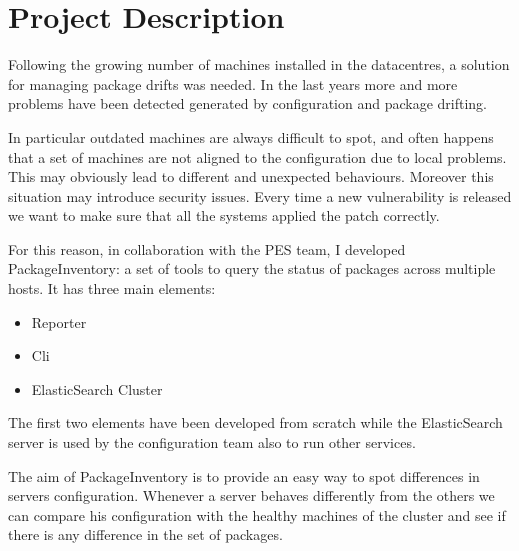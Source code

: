 \section{Project Description}

Following the growing number of machines installed in the datacentres,
a solution for managing package drifts was needed. In the last years more
and more problems have been detected generated by configuration and
package drifting.

In particular outdated machines are always difficult to spot, and often
happens that a set of machines are not aligned to the configuration due to
local problems. This may obviously lead to different and unexpected
behaviours. Moreover this situation may introduce security issues. Every
time a new vulnerability is released we want to make sure that all the
systems applied the patch correctly.

For this reason, in collaboration with the PES team, I developed
PackageInventory: a set of tools to query the status of packages across
multiple hosts. It has three main elements:

\begin{itemize}
  \item Reporter
  \item Cli
  \item ElasticSearch Cluster
\end{itemize}

The first two elements have been developed from scratch while the
ElasticSearch server is used by the configuration team also to run other
services.

The aim of PackageInventory is to provide an easy way to spot differences
in servers configuration. Whenever a server behaves differently from the
others we can compare his configuration with the healthy machines of the
cluster and see if there is any difference in the set of packages.
